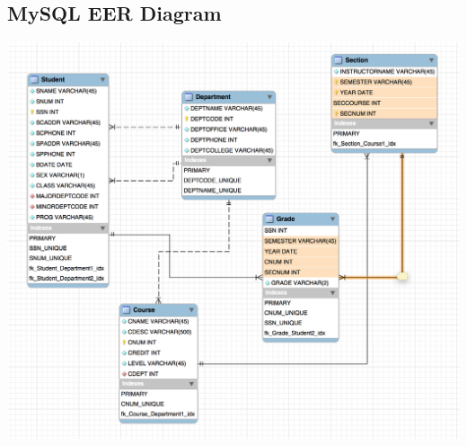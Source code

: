 \documentclass[12pt]{article}
\begin{document}
		\subsection{MySQL EER Diagram}
			\begin{center}
				\includegraphics[scale=0.35]{erd.PNG}\\
			\end{center}
\end{document}
